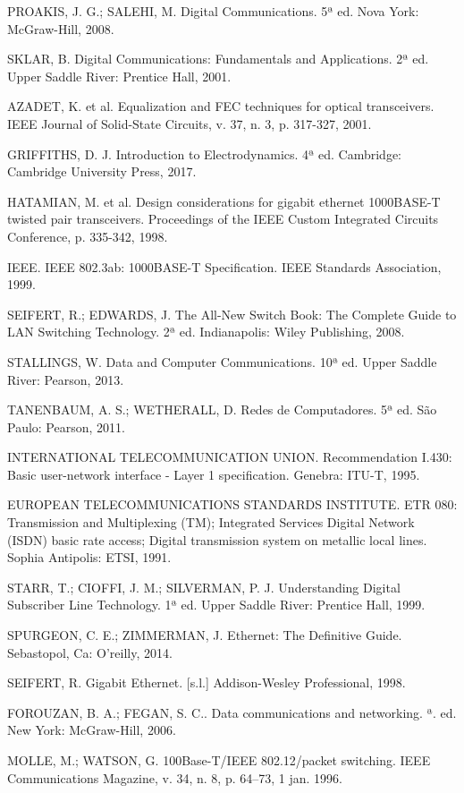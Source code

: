 \documentclass[conference]{IEEEtran}
\begin{document}
\begin{thebibliography}{00}


PROAKIS, J. G.; SALEHI, M. Digital Communications. 5ª ed. Nova York: McGraw-Hill, 2008.

SKLAR, B. Digital Communications: Fundamentals and Applications. 2ª ed. Upper Saddle River: Prentice Hall, 2001.


\bibitem{}
AZADET, K. et al. Equalization and FEC techniques for optical transceivers. IEEE Journal of Solid-State Circuits, v. 37, n. 3, p. 317-327, 2001.

\bibitem{}
GRIFFITHS, D. J. Introduction to Electrodynamics. 4ª ed. Cambridge: Cambridge University Press, 2017.

\bibitem{}
HATAMIAN, M. et al. Design considerations for gigabit ethernet 1000BASE-T twisted pair transceivers. Proceedings of the IEEE Custom Integrated Circuits Conference, p. 335-342, 1998.

\bibitem{}
IEEE. IEEE 802.3ab: 1000BASE-T Specification. IEEE Standards Association, 1999.

\bibitem{}
SEIFERT, R.; EDWARDS, J. The All-New Switch Book: The Complete Guide to LAN Switching Technology. 2ª ed. Indianapolis: Wiley Publishing, 2008.

\bibitem{}
STALLINGS, W. Data and Computer Communications. 10ª ed. Upper Saddle River: Pearson, 2013.

\bibitem{}
TANENBAUM, A. S.; WETHERALL, D. Redes de Computadores. 5ª ed. São Paulo: Pearson, 2011.

\bibitem{}
INTERNATIONAL TELECOMMUNICATION UNION. Recommendation I.430: Basic user-network interface - Layer 1 specification. Genebra: ITU-T, 1995.

\bibitem{}
EUROPEAN TELECOMMUNICATIONS STANDARDS INSTITUTE. ETR 080: Transmission and Multiplexing (TM); Integrated Services Digital Network (ISDN) basic rate access; Digital transmission system on metallic local lines. Sophia Antipolis: ETSI, 1991.

\bibitem{}
STARR, T.; CIOFFI, J. M.; SILVERMAN, P. J. Understanding Digital Subscriber Line Technology. 1ª ed. Upper Saddle River: Prentice Hall, 1999.

\bibitem{}
SPURGEON, C. E.; ZIMMERMAN, J. Ethernet: The Definitive Guide. Sebastopol, Ca: O’reilly, 2014. 

\bibitem{}
SEIFERT, R. Gigabit Ethernet. [s.l.] Addison-Wesley Professional, 1998. 

\bibitem{}
FOROUZAN, B. A.; FEGAN, S. C.. Data communications and networking. ª. ed. New York: McGraw-Hill, 2006.


\bibitem{}
MOLLE, M.; WATSON, G. 100Base-T/IEEE 802.12/packet switching. IEEE Communications Magazine, v. 34, n. 8, p. 64–73, 1 jan. 1996.

\end{thebibliography}
\end{document}
